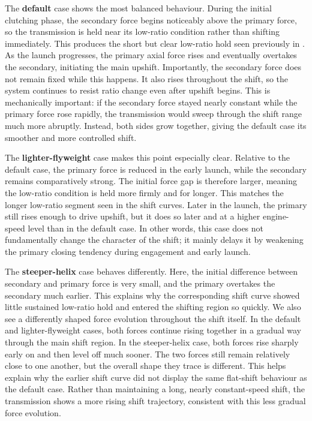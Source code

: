 \documentclass[11pt]{article}
\numberwithin{equation}{section}
\begin{document}
The \textbf{default} case shows the most balanced behaviour. During the initial
clutching phase, the secondary force begins noticeably above the primary force,
so the transmission is held near its low-ratio condition rather than shifting
immediately. This produces the short but clear low-ratio hold seen previously
in . As the launch progresses, the primary axial force
rises and eventually overtakes the secondary, initiating the main upshift.
Importantly, the secondary force does not remain fixed while this happens. It
also rises throughout the shift, so the system continues to resist ratio change
even after upshift begins. This is mechanically important: if the secondary
force stayed nearly constant while the primary force rose rapidly, the
transmission would sweep through the shift range much more abruptly. Instead,
both sides grow together, giving the default case its smoother and more
controlled shift.

The \textbf{lighter-flyweight} case makes this point especially clear. Relative
to the default case, the primary force is reduced in the early launch, while the
secondary remains comparatively strong. The initial force gap is therefore
larger, meaning the low-ratio condition is held more firmly and for longer.
This matches the longer low-ratio segment seen in the shift curves. Later in
the launch, the primary still rises enough to drive upshift, but it does so
later and at a higher engine-speed level than in the default case. In other
words, this case does not fundamentally change the character of the shift; it
mainly delays it by weakening the primary closing tendency during engagement and
early launch.

The \textbf{steeper-helix} case behaves differently. Here, the initial
difference between secondary and primary force is very small, and the primary
overtakes the secondary much earlier. This explains why the corresponding shift
curve showed little sustained low-ratio hold and entered the shifting region so
quickly. We also see a differently shaped force evolution throughout the shift
itself. In the default and lighter-flyweight cases, both forces continue rising
together in a gradual way through the main shift region. In the steeper-helix
case, both forces rise sharply early on and then level off much sooner. The two
forces still remain relatively close to one another, but the overall shape they
trace is different. This helps explain why the earlier shift curve did not
display the same flat-shift behaviour as the default case. Rather than
maintaining a long, nearly constant-speed shift, the transmission shows a more
rising shift trajectory, consistent with this less gradual force evolution.
\end{document}
